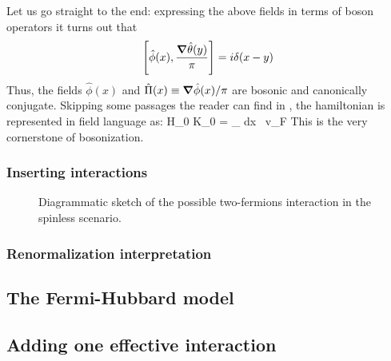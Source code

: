 Let us go straight to the end: expressing the above fields in terms of boson operators it turns out that
\[
	\comm{\hat \phi(x)}{\frac{\grad \hat \theta(y)}{\pi}} = i \delta(x-y)
\]
Thus, the fields $\hat \phi(x)$ and $\hat \Pi(x) \equiv \grad \hat \phi(x)/\pi$ are bosonic and canonically conjugate.
Skipping some passages the reader can find in \cite{giamarchi2003quantum}, the hamiltonian is represented in field language as:
\beq\label{eq:free-field-hamiltonian}
	\hat H_0 \simeq \hat K_0 =  \int_ dx \, v_F 
\eeq
This is the very cornerstone of bosonization. 

\subsubsection*{Inserting interactions}

\begin{figure}
	\centering
	\subfloat[][$g_2 = V(q \approx 0)$ process.]{
		
		\label{fig:g2-process}
	}
	\subfloat[][$g_4 = V(q \approx 0)$ process.]{
		
		\label{fig:g4-process}
	}
	\label{fig:g-processes}
	\caption{Diagrammatic sketch of the possible two-fermions interaction in the spinless scenario.}
\end{figure}

\subsubsection*{Renormalization interpretation}

\subsection{The Fermi-Hubbard model}

\todo

\subsection{Adding one effective interaction}

\todo